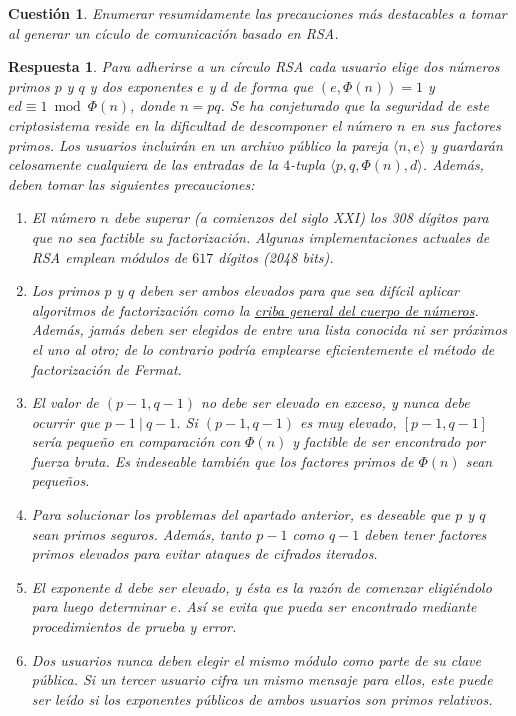 \documentclass[
  a4paper,
  spanish,
  12pt,
]{scrartcl}
\theoremstyle{ejercicio-style}
\newtheorem{ejer}{Cuestión}
\theoremstyle{remark-style}
\newtheorem*{sol}{Respuesta}
\theoremstyle{teorema-style}
\begin{document}
\begin{ejer}
  Enumerar resumidamente las precauciones más destacables a tomar al generar un cículo de comunicación basado en RSA.
\end{ejer}

\begin{sol}
  Para adherirse a un círculo RSA cada usuario elige dos números primos $p$ y $q$ y dos exponentes $e$ y $d$ de forma que $(e, \Phi(n)) = 1$ y $ed \equiv 1 \bmod \Phi(n)$, donde $n=pq$. Se ha conjeturado que la seguridad de este criptosistema reside en la dificultad de descomponer el número $n$ en sus factores primos. Los usuarios incluirán en un archivo público la pareja $\langle n, e\rangle$ y guardarán celosamente cualquiera de las entradas de la $4$-tupla $\langle p, q, \Phi(n), d \rangle$. Además, deben tomar las siguientes precauciones:
  \begin{enumerate}
    \item El número $n$ debe superar (a comienzos del siglo XXI) los 308 dígitos para que no sea factible su factorización. Algunas implementaciones actuales de RSA emplean módulos de $617$ dígitos (2048 bits).
    \item Los primos $p$ y $q$ deben ser ambos elevados para que sea difícil aplicar algoritmos de factorización como la \href{https://en.wikipedia.org/wiki/General_number_field_sieve}{criba general del cuerpo de números}. Además, jamás deben ser elegidos de entre una lista conocida ni ser próximos el uno al otro; de lo contrario podría emplearse eficientemente el método de factorización de Fermat.
    \item El valor de $(p-1, q-1)$ no debe ser elevado en exceso, y nunca debe ocurrir que $p-1 \ | \ q-1$. Si $(p-1, q-1)$ es muy elevado, $[p-1, q-1]$ sería pequeño en comparación con $\Phi(n)$ y factible de ser encontrado por fuerza bruta. Es indeseable también que los factores primos de $\Phi(n)$ sean pequeños.
    \item Para solucionar los problemas del apartado anterior, es deseable que $p$ y $q$ sean \textit{primos seguros}. Además, tanto $p-1$ como $q-1$ deben tener factores primos elevados para evitar ataques de cifrados iterados.
    \item El exponente $d$ debe ser elevado, y ésta es la razón de comenzar eligiéndolo para luego determinar $e$. Así se evita que pueda ser encontrado mediante procedimientos de prueba y error.
    \item Dos usuarios nunca deben elegir el mismo módulo como parte de su clave pública. Si un tercer usuario cifra un mismo mensaje para ellos, este puede ser leído si los exponentes públicos de ambos usuarios son primos relativos.

\end{enumerate}
\end{sol}
\end{document}
